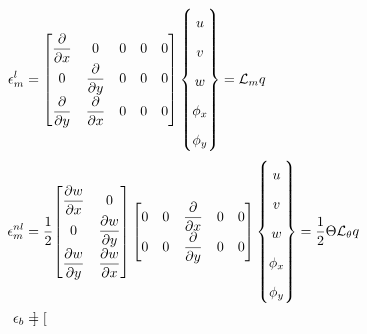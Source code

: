 \documentclass[12pt]{article}
\numberwithin{equation}{section}
\newcommand{\dpdiff}[2]{ \dfrac{\partial #1}{ \partial #2} }
\begin{document}
\begin{subequations}
    \begin{align}
        \label{eq:linear_membrane_strain_operator}
        \epsilon_m^l    & =
        {\renewcommand\arraystretch{1.75}
        \begin{bmatrix}
            \dpdiff{ }{x} & 0             & 0 & 0 & 0 \\
            0             & \dpdiff{ }{y} & 0 & 0 & 0 \\
            \dpdiff{ }{y} & \dpdiff{ }{x} & 0 & 0 & 0 \\
        \end{bmatrix}
        }
        \begin{Bmatrix}
            u      \\
            v      \\
            w      \\
            \phi_x \\
            \phi_y
        \end{Bmatrix} = \mathcal{L}_m q                         \\
        \label{eq:nonlinear_membrane_strain_operator}
        \epsilon_m^{nl} & = \frac{1}{2}
        {\renewcommand\arraystretch{1.75}
            \begin{bmatrix}
                \dpdiff{w}{x} & 0             \\
                0             & \dpdiff{w}{y} \\
                \dpdiff{w}{y} & \dpdiff{w}{x} \\
            \end{bmatrix}
            \begin{bmatrix}
                0 & 0 & \dpdiff{ }{x} & 0 & 0 \\
                0 & 0 & \dpdiff{ }{y} & 0 & 0
            \end{bmatrix}
        }
        \begin{Bmatrix}
            u      \\
            v      \\
            w      \\
            \phi_x \\
            \phi_y
        \end{Bmatrix} = \frac{1}{2} \Theta \mathcal{L}_\theta q \\
        \label{eq:bending_strain_operator}
        \epsilon_b      & =
        {\renewcommand\arraystretch{1.75}
        \begin{bmatrix}

\end{bmatrix}}
\end{align}
\end{subequations}
\end{document}
